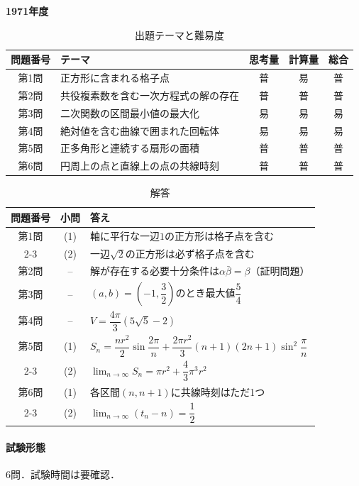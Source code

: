 \documentclass[../../main.tex]{subfiles}
\begin{document}
\begin{center}
  {\fontsize{48pt}{58pt}\selectfont \textbf{1971}\normalsize\textbf{年度}}
\end{center}

\begin{table}[htb]
  \centering
  \caption{出題テーマと難易度}
  \begin{tabular}{|c|p{6.2cm}|c|c|c|}
    \hline
    \textbf{問題番号} & \textbf{テーマ} & \textbf{思考量} & \textbf{計算量} & \textbf{総合} \\
    \hline
    第1問 & 正方形に含まれる格子点 & 普 & 易 & 普 \\
    \hline
    第2問 & 共役複素数を含む一次方程式の解の存在 & 普 & 普 & 普 \\
    \hline
    第3問 & 二次関数の区間最小値の最大化 & 易 & 易 & 易 \\
    \hline
    第4問 & 絶対値を含む曲線で囲まれた回転体 & 易 & 易 & 易 \\
    \hline
    第5問 & 正多角形と連続する扇形の面積 & 普 & 普 & 普 \\
    \hline
    第6問 & 円周上の点と直線上の点の共線時刻 & 普 & 普 & 普 \\
    \hline
  \end{tabular}
\end{table}

\begin{table}[htb]
  \centering
  \caption{解答}
  \renewcommand{\arraystretch}{1.4}
  \begin{tabular}{|c|c|p{9cm}|}
    \hline
    \textbf{問題番号} & \textbf{小問} & \textbf{答え} \\
    \hline
    第1問 & (1) & 軸に平行な一辺$1$の正方形は格子点を含む \\
    \cline{2-3}
    & (2) & 一辺$\sqrt{2}$の正方形は必ず格子点を含む \\
    \hline
    第2問 & -- & 解が存在する必要十分条件は$\alpha\bar{\beta}=\beta$（証明問題） \\
    \hline
    第3問 & -- & $(a,b)=(-1,\dfrac{3}{2})$のとき最大値$\dfrac{5}{4}$ \\
    \hline
    第4問 & -- & $V=\dfrac{4\pi}{3}(5\sqrt{5}-2)$ \\
    \hline
    第5問 & (1) & $S_n=\dfrac{nr^2}{2}\sin\dfrac{2\pi}{n}+\dfrac{2\pi r^2}{3}(n+1)(2n+1)\sin^2\dfrac{\pi}{n}$ \\
    \cline{2-3}
    & (2) & $\displaystyle\lim_{n\to\infty}S_n=\pi r^2+\dfrac{4}{3}\pi^3r^2$ \\
    \hline
    第6問 & (1) & 各区間$(n,n+1)$に共線時刻はただ1つ \\
    \cline{2-3}
    & (2) & $\displaystyle\lim_{n\to\infty}(t_n-n)=\dfrac{1}{2}$ \\
    \hline
  \end{tabular}
\end{table}

\paragraph{試験形態}
6問．試験時間は要確認．
\end{document}
